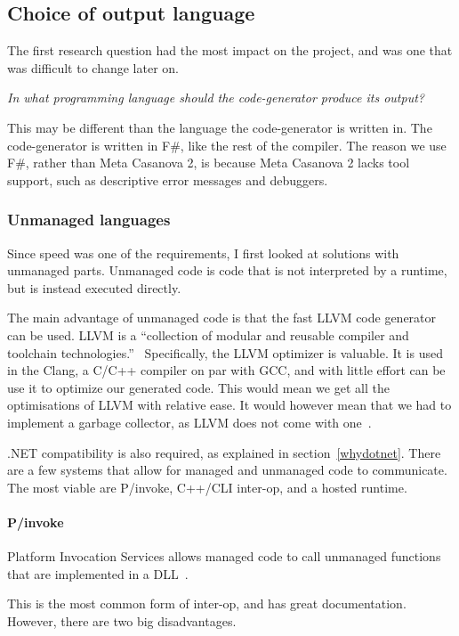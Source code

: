 \subsection{Choice of output language}
The first research question had the most impact on the project, and was one that was difficult to change later on.

\textit{In what programming language should the code-generator produce its output?}

This may be different than the language the code-generator is written in.
The code-generator is written in F\#, like the rest of the compiler.
The reason we use F\#, rather than Meta Casanova 2, is because Meta Casanova 2 lacks tool support, such as descriptive error messages and debuggers.

\subsubsection{Unmanaged languages}
Since speed was one of the requirements, I first looked at solutions with unmanaged parts.
Unmanaged code is code that is not interpreted by a runtime, but is instead executed directly.

The main advantage of unmanaged code is that the fast LLVM code generator can be used.
LLVM is a ``collection of modular and reusable compiler and toolchain technologies.''~\cite{llvm}
Specifically, the LLVM optimizer is valuable.
It is used in the Clang, a C/C++ compiler on par with GCC, and with little effort can be use it to optimize our generated code.
This would mean we get all the optimisations of LLVM with relative ease.
It would however mean that we had to implement a garbage collector, as LLVM does not come with one~\cite{llvmgc}.
 
.NET compatibility is also required, as explained in section~\ref{whydotnet}.
There are a few systems that allow for managed and unmanaged code to communicate.
The most viable are P/invoke, C++/CLI inter-op, and a hosted runtime.

\paragraph{P/invoke}
Platform Invocation Services allows managed code to call unmanaged functions that are implemented in a DLL~\cite{msdn_pinvoke}.

This is the most common form of inter-op, and has great documentation.
However, there are two big disadvantages.

